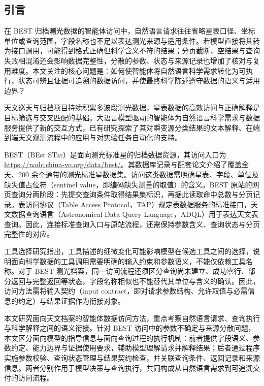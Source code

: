 \documentclass{dcfp}
\begin{document}
\begin{PaperBody}
\section*{引言}

在 BEST 归档测光数据的智能体访问中，自然语言请求往往省略星表口径、坐标单位或查询范围，字段名称也不足以表达测光来源与适用条件。若模型直接将其转为接口调用，可能得到格式正确但科学含义不符的结果；分页截断、空结果与查询失败相混淆还会影响数据完整性，分散的参数、状态与来源记录也增加了核对与复用难度。本文关注的核心问题是：如何使智能体将自然语言科学需求转化为可执行、状态可辨且证据可追溯的数据访问，并使最终科学陈述遵守数据的语义与适用边界？

天文巡天与归档项目持续积累多波段测光数据，星表数据的高效访问与正确解释是目标筛选与交叉匹配的基础。大语言模型驱动的智能体为自然语言科学需求与数据服务提供了新的交互方式，已有研究探索了其对瞬变源分类结果的文本解释\citep{ref1}、在端到端天文观测流程中的应用\citep{ref2}与对实验任务自动化的支持\citep{ref3}。

BEST（BEst STar）是面向测光标准星的归档数据资源，其访问入口为 \url{https://nadc.china-vo.org/data/best/}。其数据库记录与配套论文介绍了覆盖全天、200 余个通带的测光标准星数据集\citep{ref4,ref5}。访问这类数据需明确星表、字段、单位及缺失值占位符（sentinel value，即编码缺失测量的取值）的含义。BEST 原站的网页查询分两阶段：先提交查询条件取得结果集标识，再据此读取命中总数与分页记录。表访问协议（Table Access Protocol，TAP）规定表数据服务的标准接口，天文数据查询语言（Astronomical Data Query Language，ADQL）用于表达天文表查询\citep{ref6,ref13}。因此，连接标准查询入口与原站流程，还需保持参数含义、查询状态与分页完整性的对应。

工具选择研究指出，工具描述的细微变化可能影响模型在候选工具之间的选择\citep{ref7}，说明面向科学数据的工具调用需要明确的输入约束和参数语义，不能仅依赖工具名称。对于 BEST 测光档案，同一访问流程还须区分查询尚未建立、成功零行、部分返回与完整返回等状态，字段名称相似也不能替代其单位与含义的确认。因此，访问方法需将输入契约（input contract，即对请求参数结构、允许取值与必需信息的约定）与结果证据作为衔接对象。

本文研究面向天文档案的智能体数据访问方法，重点考察自然语言请求、查询执行与科学解释之间的语义衔接。针对 BEST 访问中的参数不确定与来源分散问题，本文区分面向模型的指导信息与面向查询过程的执行机制：前者提供字段语义、参数约定、能力边界与证据使用要求，辅助模型理解请求并解释结果；后者通过程序实施参数校验、查询状态管理与结果契约检查，并关联查询条件、返回记录和来源信息。两者分别作用于模型决策与查询执行，共同构成从自然语言需求到可追溯交付的访问流程。


\end{PaperBody}
\end{document}

